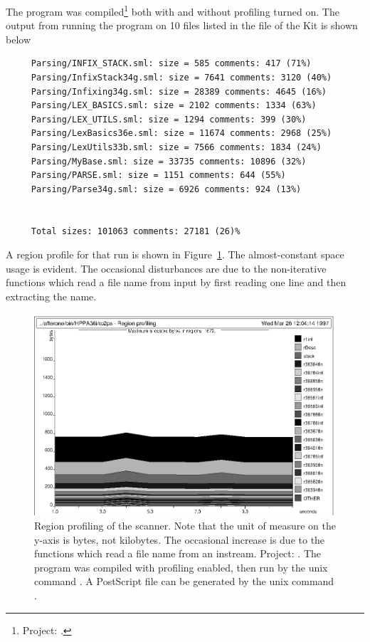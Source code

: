 \documentclass[12pt]{book}
\begin{document}
The program was compiled\footnote{Project: .} both
with and without profiling turned on. The output from running the
program on 10 files listed in the 
file of the Kit is shown below
\begin{verbatim}
     Parsing/INFIX_STACK.sml: size = 585 comments: 417 (71%)
     Parsing/InfixStack34g.sml: size = 7641 comments: 3120 (40%)
     Parsing/Infixing34g.sml: size = 28389 comments: 4645 (16%)
     Parsing/LEX_BASICS.sml: size = 2102 comments: 1334 (63%)
     Parsing/LEX_UTILS.sml: size = 1294 comments: 399 (30%)
     Parsing/LexBasics36e.sml: size = 11674 comments: 2968 (25%)
     Parsing/LexUtils33b.sml: size = 7566 comments: 1834 (24%)
     Parsing/MyBase.sml: size = 33735 comments: 10896 (32%)
     Parsing/PARSE.sml: size = 1151 comments: 644 (55%)
     Parsing/Parse34g.sml: size = 6926 comments: 924 (13%)


     Total sizes: 101063 comments: 27181 (26)%
\end{verbatim}
A region profile for that run is shown in Figure~\ref{scan.fig}.  The
almost-constant space usage is evident. The occasional disturbances
are due to the non-iterative functions which read a file name from
input by first reading one line and then extracting the name.
\begin{figure}
\begin{center}
\includegraphics{scan.ps}
\end{center}
\caption{Region profiling of the scanner. Note that the unit of measure on 
the y-axis is bytes, not kilobytes. The occasional increase is due to the
functions which read a file name from an instream. Project: .
The program was compiled with profiling enabled, then run by the
unix command . A PostScript
file  can be generated by the unix command
.
}
\label{scan.fig}
\end{figure}
%
%
\end{document}
